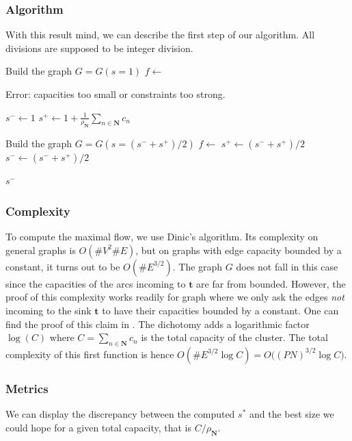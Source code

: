 \documentclass[]{article}
\begin{document}
\subsubsection*{Algorithm}
With this result mind, we can describe the first step of our algorithm. All divisions are supposed to be integer division.
\begin{algorithmic}[1]
	
	\State Build the graph $G=G(s=1)$
	\State $ f \leftarrow$ 
	
	\State \Return Error: capacities too small or constraints too strong.
	\EndIf
	
	\State $s^- \leftarrow 1$
	\State $s^+ \leftarrow 1+\frac{1}{\rho_\mathbf{N}}\sum_{n \in \mathbf{N}} c_n$
	
	\State Build the graph $G=G(s=(s^-+s^+)/2)$
	\State $ f \leftarrow$ 
	\State $s^+ \leftarrow (s^- + s^+)/2$
	\Else
	\State $s^- \leftarrow (s^- + s^+)/2$
	\EndIf
	\EndWhile
	
	\State \Return $s^-$
	\EndFunction
\end{algorithmic}

\subsubsection*{Complexity}

To compute the maximal flow, we use Dinic's algorithm. Its complexity on general graphs is $O(\#V^2 \#E)$, but on graphs with edge capacity bounded by a constant, it turns out to be $O(\#E^{3/2})$. The graph $G$ does not fall in this case since the capacities of the arcs incoming to $\mathbf{t}$ are far from bounded. However, the proof of this complexity works readily for graph where we only ask the edges \emph{not} incoming to the sink $\mathbf{t}$ to have their capacities bounded by a constant. One can find the proof of this claim in \cite[Section 2]{even1975network}.
The dichotomy adds a logarithmic factor $\log (C)$ where $C=\sum_{n \in \mathbf{N}} c_n$ is the total capacity of the cluster. The total complexity of this first function is hence 
$O(\#E^{3/2}\log C ) = O\big((PN)^{3/2} \log C\big)$.

\subsubsection*{Metrics}
We can display the discrepancy between the computed $s^*$ and the best size we could hope for a given total capacity, that is $C/\rho_\mathbf{N}$.
\end{document}
